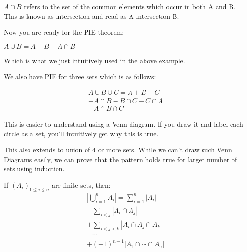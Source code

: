 \begin{definition}
    $A \cap B$ refers to the set of the common elements which occur in 
    both A and B. This is known as intersection and read as A intersection B.    
\end{definition}
Now you are ready for the PIE theorem:
\begin{theorem}
    $A \cup B = A + B - A \cap B$
\end{theorem}
Which is what we just intuitively used in the above example.\par
We also have PIE for three sets which is as follows:
\begin{theorem}
    \begin{multline*}
        A \cup B \cup C = A + B + C \\
        - A \cap B - B \cap C - C \cap A \\
        + A \cap B \cap C
    \end{multline*}    
\end{theorem}
This is easier to understand using a Venn diagram. 
If you draw it and label each circle as a set, you'll intuitively get why this is true.\par
This also extends to union of 4 or more sets. While we can't draw such 
Venn Diagrams easily, we can prove that the pattern holds true for larger number of sets using induction.
\begin{theorem}
    If $(A_i)_{1\leq i\leq n}$ are finite sets, then:
\begin{multline*}
    \left|\bigcup_{i=1}^n A_i\right|=\sum_{i=1}^n\left|A_i\right| \\
    -\sum_{i < j}\left|A_i\cap A_j\right|\\
    +\sum_{i<j<k}\left|A_i\cap A_j\cap A_k\right|\\
    -\cdots\ \\
    +(-1)^{n-1} \left|A_1\cap\cdots\cap A_n\right|{}
\end{multline*}
\end{theorem}
